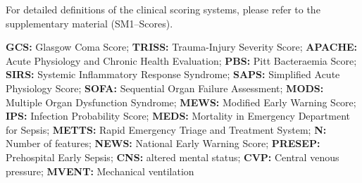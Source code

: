 \begin{table*}[ht!]
\begin{threeparttable}
    \begin{tablenotes}
        \footnotesize
        \item For detailed definitions of the clinical scoring systems, please refer to the supplementary material (SM1--Scores).
        \item \textbf{GCS:} Glasgow Coma Score; \textbf{TRISS:} Trauma-Injury Severity Score; \textbf{APACHE:} Acute Physiology and Chronic Health Evaluation; \textbf{PBS:} Pitt Bacteraemia Score; \textbf{SIRS:} Systemic Inflammatory Response Syndrome; \textbf{SAPS:} Simplified Acute Physiology Score; \textbf{SOFA:} Sequential Organ Failure Assessment; \textbf{MODS:} Multiple Organ Dysfunction Syndrome; \textbf{MEWS:} Modified Early Warning Score; \textbf{IPS:} Infection Probability Score; \textbf{MEDS:} Mortality in Emergency Department for Sepsis; \textbf{METTS:} Rapid Emergency Triage and Treatment System; \textbf{N:} Number of features; \textbf{NEWS:} National Early Warning Score; \textbf{PRESEP:} Prehospital Early Sepsis; \textbf{CNS:} altered mental status; \textbf{CVP:} Central venous pressure; \textbf{MVENT:} Mechanical ventilation
    \end{tablenotes}
    \end{threeparttable}

    
\label{tab:clinical-scoring-systems}
\end{table*}
